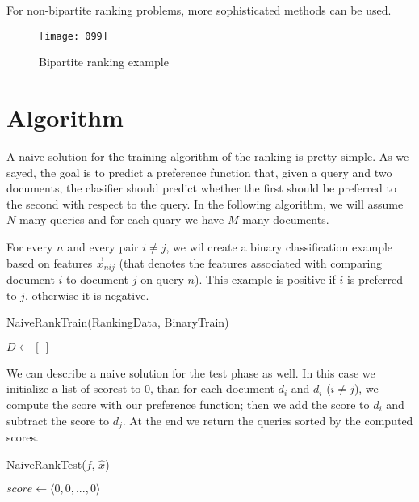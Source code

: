 For non-bipartite ranking problems, more sophisticated methods can be used.

\begin{figure}[t!]
    \centering
    \texttt{[image: 099]}
    \caption{Bipartite ranking example}
\end{figure}

\section{Algorithm}
A naive solution for the training algorithm of the ranking is pretty simple. As we sayed, the goal is to predict a preference function that, given a query and two documents, the clasifier should predict whether the first should be preferred to the second with respect to the query. In the following algorithm, we will assume \(N\)-many queries and for each quary we have \(M\)-many documents. 

For every \(n\) and every pair \(i \neq j\), we wil create a binary classification example based on features \(\vec{x}_{nij}\) (that denotes the features associated with comparing document \(i\) to document \(j\) on query \(n\)). This example is positive if \(i\) is preferred to \(j\), otherwise it is negative.

\begin{algorithm}
    \caption{NaiveRankTrain(RankingData, BinaryTrain)}
    \label{alg:naive_rank_train}
$D \gets [\ ]$\;
\end{algorithm}

We can describe a naive solution for the test phase as well. In this case we initialize a list of scorest to 0, than for each document \(d_i\) and \(d_i\) (\(i \neq j\)), we compute the score with our preference function; then we add the score to \(d_i\) and subtract the score to \(d_j\). At the end we return the queries sorted by the computed scores.

\begin{algorithm}
    \caption{NaiveRankTest($f$, $\hat{x}$)}
    \label{alg:naive_rank_test}
$score \gets \langle 0, 0, ..., 0 \rangle$\;
\end{algorithm}

